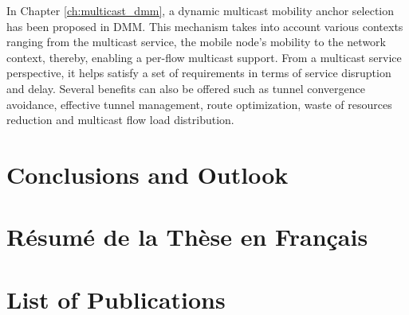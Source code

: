 \documentclass[a4paper,10pt,twoside]{ThesisStyle}
\begin{document}
In Chapter \ref{ch:multicast_dmm}, a dynamic multicast mobility anchor selection has been proposed in DMM. This mechanism takes into account various contexts ranging from the multicast service, the mobile node's mobility to the network context, thereby, enabling a per-flow multicast support. From a multicast service perspective, it helps satisfy a set of requirements in terms of service disruption and delay. Several benefits can also be offered such as tunnel convergence avoidance, effective tunnel management, route optimization, waste of resources reduction and multicast flow load distribution. 


{}
\clearpage{}
\chapter{Conclusions and Outlook}
\label{ch:CFP}


\appendix
\chapter{R\'{e}sum\'{e} de la Th\`{e}se en Fran\c{c}ais}

\chapter{List of Publications}
\label{publication}



%
%


\end{document}
